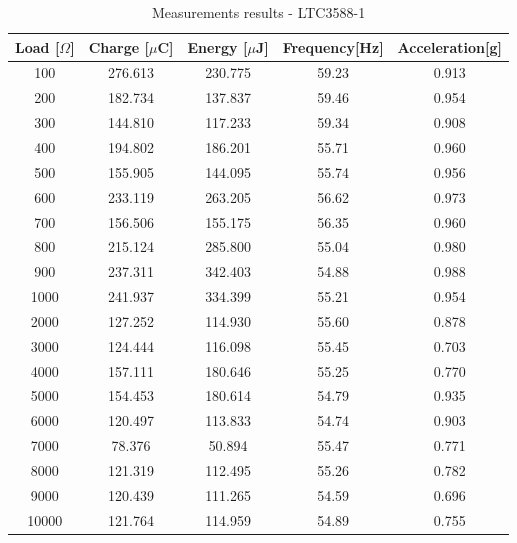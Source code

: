 \documentclass[12pt,a4paper]{article}
\begin{document}
\begin{table}[ht!]
\centering

\begin{tabular}{|c|c|c|c|c|}
    \hline
    \textbf{Load} [$\Omega$] & \textbf{Charge} [$\mu$C]& \textbf{Energy} [$\mu$J] & \textbf{Frequency}[Hz] & \textbf{Acceleration}[g] \\
 \hline
    100 & 276.613 & 230.775 & 59.23 & 0.913 \\
    \hline
    200 & 182.734 & 137.837 & 59.46 & 0.954 \\
    \hline
    300 & 144.810 & 117.233 & 59.34 & 0.908 \\
    \hline
    400 & 194.802 & 186.201 & 55.71 & 0.960 \\
    \hline
    500 & 155.905 & 144.095 & 55.74 & 0.956 \\
    \hline
    600 & 233.119 & 263.205 & 56.62 & 0.973 \\
    \hline
    700 & 156.506 & 155.175 & 56.35 & 0.960 \\
    \hline
    800 & 215.124 & 285.800 & 55.04 & 0.980 \\
    \hline
    900 & 237.311 & 342.403 & 54.88 & 0.988 \\
    \hline
    1000 & 241.937 & 334.399 & 55.21 & 0.954 \\
    \hline
    2000 & 127.252 & 114.930 & 55.60 & 0.878 \\
    \hline
    3000 & 124.444 & 116.098 & 55.45 & 0.703 \\
    \hline
    4000 & 157.111 & 180.646 & 55.25 & 0.770 \\
    \hline
    5000 & 154.453 & 180.614 & 54.79 & 0.935 \\
    \hline
    6000 & 120.497 & 113.833 & 54.74 & 0.903 \\
    \hline
    7000 & 78.376 & 50.894 & 55.47 & 0.771 \\
    \hline
    8000 & 121.319 & 112.495 & 55.26 & 0.782 \\
    \hline
    9000 & 120.439 & 111.265 & 54.59 & 0.696 \\
    \hline
    10000 & 121.764 & 114.959 & 54.89 & 0.755 \\
    \hline
\end{tabular}
\caption{Measurements results - LTC3588-1}
\label{tab:ltc3588results}
\end{table}
\end{document}

